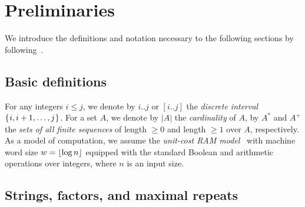 \documentclass{article}
\begin{document}



\section{Preliminaries}
\label{sec:prelim}

We introduce the definitions and notation necessary to the following sections by following~\cite{charalampopoulos2018extended,barton2014linear,ilie2011minimum,belazzougui2020linear}. 

\subsection{Basic definitions}
For any integers $i\le j$, we denote by $i..j$ or $[i..j]$ the \textit{discrete interval} $\{\kern0.05emi, i+1, \dots, j\kern0.05em\}$. For a set $A$, we denote by $|A|$ the \textit{cardinality} of $A$, by $A^*$ and $A^+$ the \textit{sets of all finite sequences} of length $\ge 0$ and length $\ge 1$ over $A$, respectively.
As a model of computation, we assume the \textit{unit-cost RAM model}~\cite{cormen2009introduction} with machine word size $w = \lfloor \log n\rfloor$ equipped with the standard Boolean and arithmetic operations over integers, where $n$ is an input size.

\subsection{Strings, factors, and maximal repeats}
\end{document}
